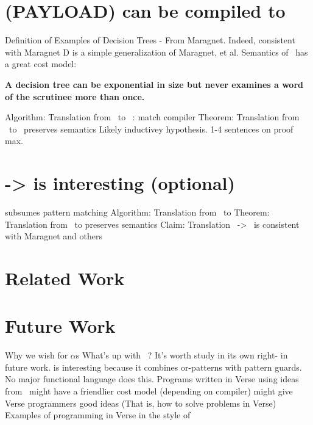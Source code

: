 \documentclass[manuscript,screen,review, 12pt]{acmart}
\begin{document}
\section{(PAYLOAD) {\VMinus} can be compiled to }
\begin{outline}[enumerate]
    \1 Definition of \D 
    \1 Examples of Decision Trees - From Maragnet. 
    \2 Indeed, consistent with Maragnet 
    \1 D is a simple generalization of Maragnet, et al. 
    \1 Semantics of \D 
    \1 \D\ has a great cost model: 

    \bf{A decision tree can be exponential in size but never examines a word of
    the scrutinee more than once. }

    \1 Algorithm: Translation from \VMinus\ to \D\ : match compiler 
    \1 Theorem: Translation from \VMinus\ to \D\ preserves semantics 
    \2 Likely inductivey hypothesis. 1-4 sentences on proof max. 
\end{outline}

\section{\PPlus -> \VMinus is interesting (optional)}
\begin{outline}[enumerate]
    \1 \VMinus subsumes pattern matching 
    \1 Algorithm: Translation from \PPlus\ to \VMinus
    \1 Theorem: Translation from \PPlus\ to \VMinus preserves semantics 
    \1 Claim: Translation \PPlus\ -> \D\ is consistent with Maragnet and others
\end{outline}

\section{Related Work}
\section{Future Work}
\begin{outline}[enumerate]
    \1 Why we wish for $\alpha$s
    \1 What's up with \PPlus\ ? It's worth study in its own right- in future work.
    \2 \PPlus is interesting because it combines or-patterns with pattern 
        guards. No major functional language does this. 
    \1 Programs written in Verse using ideas from \VMinus\ might have a 
    friendlier cost model (depending on compiler)
    \1 \VMinus might give Verse programmers good ideas 
        (That is, how to solve problems in Verse)
    \2 Examples of programming in Verse in the style of \VMinus 
\end{outline}
\end{document}

